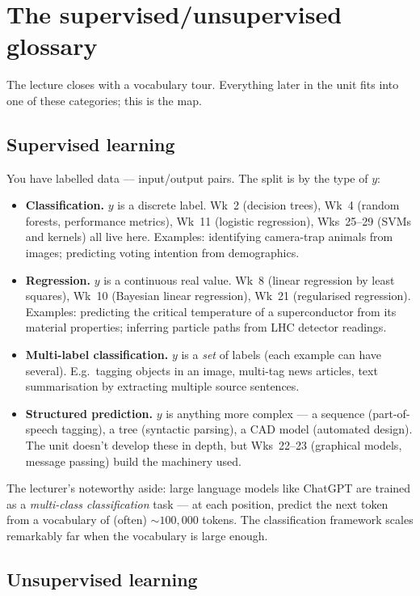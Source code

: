 \documentclass[11pt, a4paper]{article}
\begin{document}
\section{The supervised/unsupervised glossary}

The lecture closes with a vocabulary tour. Everything later in the unit fits into one of these categories; this is the map.

\subsection{Supervised learning}

You have labelled data — input/output pairs. The split is by the type of $y$:

\begin{itemize}
  \item \textbf{Classification.} $y$ is a discrete label. Wk~2 (decision trees), Wk~4 (random forests, performance metrics), Wk~11 (logistic regression), Wks~25--29 (SVMs and kernels) all live here. Examples: identifying camera-trap animals from images; predicting voting intention from demographics.
  \item \textbf{Regression.} $y$ is a continuous real value. Wk~8 (linear regression by least squares), Wk~10 (Bayesian linear regression), Wk~21 (regularised regression). Examples: predicting the critical temperature of a superconductor from its material properties; inferring particle paths from LHC detector readings.
  \item \textbf{Multi-label classification.} $y$ is a \emph{set} of labels (each example can have several). E.g.\ tagging objects in an image, multi-tag news articles, text summarisation by extracting multiple source sentences.
  \item \textbf{Structured prediction.} $y$ is anything more complex — a sequence (part-of-speech tagging), a tree (syntactic parsing), a CAD model (automated design). The unit doesn't develop these in depth, but Wks~22--23 (graphical models, message passing) build the machinery used.
\end{itemize}

The lecturer's noteworthy aside: large language models like ChatGPT are trained as a \emph{multi-class classification} task — at each position, predict the next token from a vocabulary of (often) $\sim 100{,}000$ tokens. The classification framework scales remarkably far when the vocabulary is large enough.

\subsection{Unsupervised learning}
\end{document}
